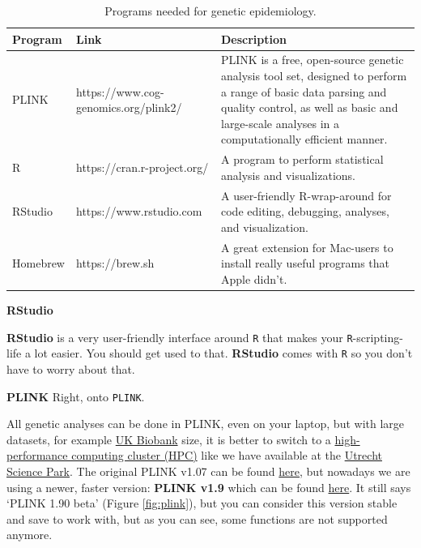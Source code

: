 \documentclass[
]{book}
\newcommand{\passthrough}[1]{#1}
\begin{document}
\begin{table}

\caption{\label{tab:programs}Programs needed for genetic epidemiology.}
\centering
\begin{tabular}[t]{l|l|l}
\hline
Program & Link & Description\\
\hline
PLINK & https://www.cog-genomics.org/plink2/ & PLINK is a free, open-source genetic analysis tool set, designed to perform a range of basic data parsing and quality control, as well as basic and large-scale analyses in a computationally efficient manner.\\
\hline
R & https://cran.r-project.org/ & A program to perform statistical analysis and visualizations.\\
\hline
RStudio & https://www.rstudio.com & A user-friendly R-wrap-around for code editing, debugging, analyses, and visualization.\\
\hline
Homebrew & https://brew.sh & A great extension for Mac-users to install really useful programs that Apple didn't.\\
\hline
\end{tabular}
\end{table}

\textbf{RStudio}

\textbf{RStudio} is a very user-friendly interface around \passthrough{\lstinline!R!} that makes your \passthrough{\lstinline!R!}-scripting-life a lot easier. You should get used to that. \textbf{RStudio} comes with \passthrough{\lstinline!R!} so you don't have to worry about that.

\textbf{PLINK}
Right, onto \passthrough{\lstinline!PLINK!}.

All genetic analyses can be done in PLINK, even on your laptop, but with large datasets, for example \href{https://www.ukbiobank.ac.uk}{UK Biobank} size, it is better to switch to a \href{https://en.wikipedia.org/wiki/High-performance_computing}{high-performance computing cluster (HPC)} like we have available at the \href{https://wiki.bioinformatics.umcutrecht.nl/bin/view/HPC/WebHome}{Utrecht Science Park}. The original PLINK v1.07 can be found \href{https://zzz.bwh.harvard.edu/plink/index.shtml}{here}, but nowadays we are using a newer, faster version: \textbf{PLINK v1.9} which can be found \href{https://www.cog-genomics.org/plink2}{here}. It still says `PLINK 1.90 beta' (Figure \ref{fig:plink}), but you can consider this version stable and save to work with, but as you can see, some functions are not supported anymore.
\end{document}
